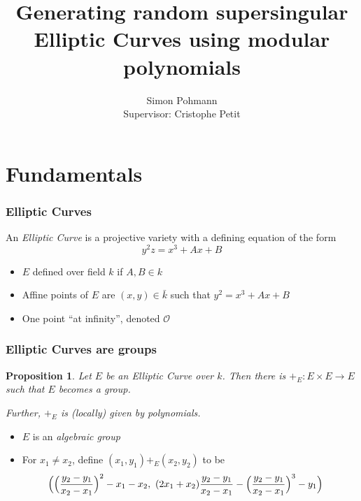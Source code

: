 \documentclass{beamer}
\title{Generating random supersingular Elliptic Curves using modular polynomials}
\author{Simon Pohmann\\Supervisor: Cristophe Petit}
\renewcommand{\O}{\mathcal{O}}
\newtheorem{proposition}{Proposition}
\begin{document}
\maketitle

\section{Fundamentals}

\begin{frame}
    \frametitle{Elliptic Curves}
    \begin{definition}
        An \emph{Elliptic Curve} is a projective variety with a defining equation of the form
        \begin{equation*}
            y^2 z = x^3 + Ax + B
        \end{equation*}
    \end{definition}
    \begin{itemize}
        \item $E$ defined over field $k$ if $A, B \in k$
        \item Affine points of $E$ are $(x, y) \in \bar{k}$ such that $y^2 = x^3 + Ax + B$
        \item One point ``at infinity'', denoted $\O$
    \end{itemize}
\end{frame}

\begin{frame}
    \frametitle{Elliptic Curves are groups}

    \begin{proposition}
        Let $E$ be an Elliptic Curve over $k$.
        Then there is $+_E: E \times E \to E$ such that $E$ becomes a group.

        Further, $+_E$ is (locally) given by polynomials.
    \end{proposition}
    \begin{itemize}
        \item $E$ is an \emph{algebraic group}
        \item For $x_1 \neq x_2$, define $(x_1, y_1) +_E (x_2, y_2)$ to be
        \begin{align*}
            &\Bigl( \Bigl(\frac {y_2 - y_1} {x_2 - x_1}\Bigr)^2 - x_1 - x_2, \ (2x_1 + x_2)\frac {y_2 - y_1} {x_2 - x_1} - \Bigl(\frac {y_2 - y_1} {x_2 - x_1}\Bigr)^3 - y_1 \Bigr)
        \end{align*}
    \end{itemize}
\end{frame}
\end{document}
